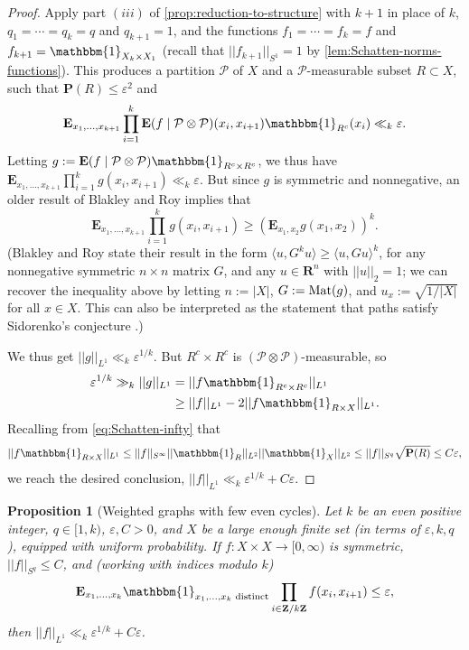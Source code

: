 \documentclass[reqno,11pt]{amsart}
\newtheorem{proposition}[theorem]{Proposition}
\theoremstyle{definition}
\theoremstyle{remark}
\numberwithin{equation}{section}
\newcommand{\Z}{\mathbf{Z}}
\newcommand{\R}{\mathbf{R}}
\renewcommand{\P}{\mathbf{P}}
\newcommand{\E}{\mathbf{E}}
\newcommand{\mP}{\mathcal{P}}
\newcommand{\one}{\mathbbm{1}}
\newcommand{\eps}{\varepsilon}
\newcommand{\Mat}{\textnormal{Mat}}
\begin{document}
\begin{proof}
Apply part $(iii)$ of \cref{prop:reduction-to-structure} with $k+1$ in place of $k$, $q_1 = \cdots = q_{k} = q$ and $q_{k+1} = 1$, and the functions $f_{1} = \cdots = f_{k} = f$ and $f_{k+1} = \one_{X_k \times X_1}$ (recall that $||f_{k+1}||_{S^1} = 1$ by \cref{lem:Schatten-norms-functions}). This produces a partition $\mP$ of $X$ and a $\mP$-measurable subset $R \subset X$, such that $\P(R) \le \eps^2$ and
\[
    \E_{x_1,\ldots,x_{k+1}} \prod_{i=1}^k \E(f \mid \mP \otimes \mP)(x_i, x_{i+1}) \one_{R^c}(x_i) \ll_k \eps.
\]
Letting $g := \E(f \mid \mP \otimes \mP) \one_{R^c \times R^c}$, we thus have $\E_{x_1,\ldots,x_{k+1}} \prod_{i=1}^k g(x_i, x_{i+1}) \ll_k \eps$. But since $g$ is symmetric and nonnegative, an older result of Blakley and Roy \cite{blakley1965holder} implies that
\[
    \E_{x_1,\ldots,x_{k+1}}
    \prod_{i=1}^k g(x_i, x_{i+1}) 
    \ge 
    \left( \E_{x_1,x_2} g(x_1, x_2) \right)^k.
\]
(Blakley and Roy state their result in the form $\langle u, G^ku \rangle \ge \langle u, Gu \rangle^k$, for any nonnegative symmetric $n \times n$ matrix $G$, and any $u \in \R^n$ with $||u||_{2} = 1$; we can recover the inequality above by letting $n := |X|$, $G := \Mat(g)$, and $u_x := \sqrt{1/|X|}$ for all $x \in X$. This can also be interpreted as the statement that paths satisfy Sidorenko's conjecture \cite{sidorenko1991inequalities}.) 

We thus get $||g||_{L^1} \ll_k \eps^{1/k}$. But $R^c \times R^c$ is $(\mP \otimes \mP)$-measurable, so 
\[
\begin{aligned}
    \eps^{1/k} \gg_k ||g||_{L^1}
    &= ||f \one_{R^c \times R^c}||_{L^1} 
    \\
    &\ge ||f||_{L^1} - 2||f \one_{R \times X}||_{L^1}. 
\end{aligned}
\]
Recalling from \cref{eq:Schatten-infty} that 
\[
    ||f \one_{R \times X}||_{L^1} \le ||f||_{S^\infty} ||\one_R||_{L^2} ||\one_X||_{L^2} 
    \le ||f||_{S^q} \sqrt{\P(R)} \le C\eps,
\]
we reach the desired conclusion, $||f||_{L^1} \ll_k \eps^{1/k} + C\eps$.
\end{proof}


\begin{proposition}[Weighted graphs with few even cycles] \label{prop:few-even-cycles}
Let $k$ be an even positive integer, $q \in [1, k)$, $\eps, C > 0$, and $X$ be a large enough finite set (in terms of $\eps, k, q$), equipped with uniform probability. If $f : X \times X \to [0, \infty)$ is symmetric, $||f||_{S^q} \le C$, and (working with indices modulo $k$)
\[
    \E_{x_1,\ldots,x_k} \one_{x_1,\ldots,x_k \textnormal{ distinct}} \prod_{i \in \Z/k\Z} f(x_i, x_{i+1}) \le \eps,
\]
then $||f||_{L^1} \ll_k \eps^{1/k} + C\eps$.
\end{proposition}
\end{document}
